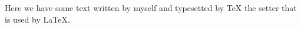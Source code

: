 \usepackage{todonotes}

Here we have some text written by myself and typesetted by {\TeX}  the setter that is used by {\LaTeX}.

